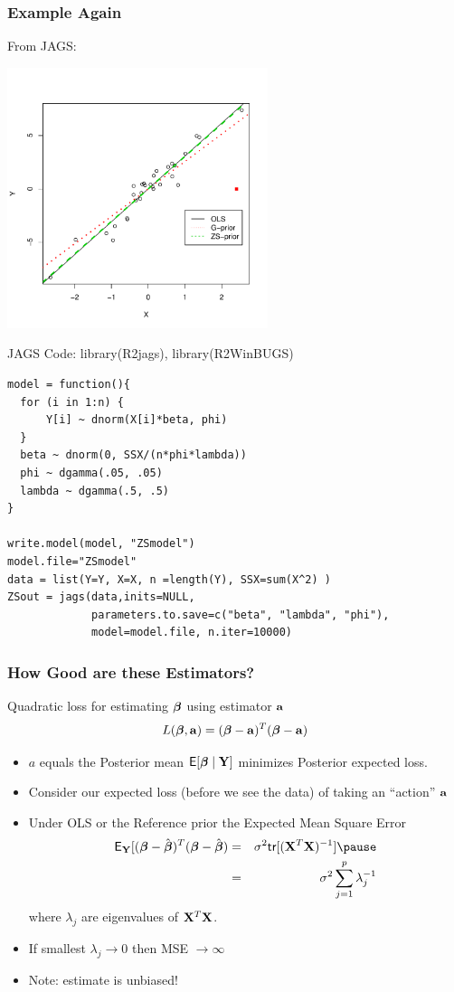 \documentclass[]{beamer}
\begin{document}
\begin{frame} \frametitle{Example Again}
  From JAGS:

\includegraphics[height=3in]{ZSprior.pdf}

\end{frame}

\begin{frame}[fragile]{JAGS Code: library(R2jags), library(R2WinBUGS)}
\begin{verbatim}
model = function(){
  for (i in 1:n) {
      Y[i] ~ dnorm(X[i]*beta, phi)
  }
  beta ~ dnorm(0, SSX/(n*phi*lambda))
  phi ~ dgamma(.05, .05)
  lambda ~ dgamma(.5, .5)
}

write.model(model, "ZSmodel")
model.file="ZSmodel"
data = list(Y=Y, X=X, n =length(Y), SSX=sum(X^2) )
ZSout = jags(data,inits=NULL, 
             parameters.to.save=c("beta", "lambda", "phi"), 
             model=model.file, n.iter=10000)
\end{verbatim}
\end{frame}
\begin{frame}
  \frametitle{How Good are these Estimators?}
Quadratic loss for estimating  $\boldsymbol{\beta}$ using estimator $\mathbf{a}$
$$ L(\boldsymbol{\beta}, \mathbf{a}) =  ( \boldsymbol{\beta} - \mathbf{a})^T(\boldsymbol{\beta} -\mathbf{a})$$ \pause

\begin{itemize}
\item $a$ equals the Posterior mean $\textsf{E}[\boldsymbol{\beta} \mid \mathbf{Y}]$ minimizes
  Posterior expected loss. \pause
\item Consider our expected loss (before we see the data) of taking an
``action'' $\mathbf{a}$ \pause
\item Under OLS or the  Reference prior the Expected Mean Square Error  \pause
  \begin{eqnarray*}
\E_\Y[( \b - \bhat)^T(\b -\bhat) & = &\sigma^2
  \tr[(\X^T\X)^{-1}] \pause \\
 & = & \sigma^2 \sum_{j=1}^p \lambda_j^{-1}
  \end{eqnarray*}
where $\lambda_j$ are eigenvalues of $\mathbf{X}^T\mathbf{X}$.
\pause
\item If smallest $\lambda_j \to 0$ then MSE  $\to \infty$
\item Note: estimate is unbiased! 
\end{itemize}
\end{frame}
\end{document}
